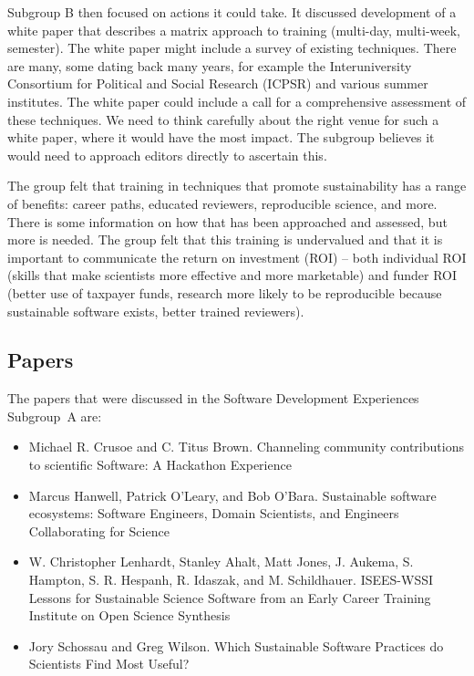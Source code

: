 \documentclass[11pt, oneside]{amsart}
\begin{document}
Subgroup B then focused on actions it could take. It discussed development of a
white paper that describes a matrix approach to training (multi-day, multi-week,
semester). The white paper might include a survey of existing techniques. There
are many, some dating back many years, for example the Interuniversity
Consortium for Political and Social Research (ICPSR) and various summer
institutes. The white paper could include a call for a comprehensive assessment
of these techniques. We need to think carefully about the right venue for such a
white paper, where it would have the most impact. The subgroup believes it would
need to approach editors directly to ascertain this.

The group felt that training in techniques that promote sustainability has a
range of benefits: career paths, educated reviewers, reproducible science, and
more. There is some information on how that has been approached and assessed,
but more is needed. The group felt that this training is undervalued and that it
is important to communicate the return on investment (ROI) -- both individual ROI
(skills that make scientists more effective and more marketable) and funder ROI
(better use of taxpayer funds, research more likely to be reproducible because
sustainable software exists, better trained reviewers).



\subsection{Papers}
The papers that were discussed in the Software Development Experiences Subgroup~A are:

\begin{itemize}
\item Michael R. Crusoe and C. Titus Brown. Channeling community contributions to
scientific Software: A Hackathon Experience~\cite{wssspe2_crusoe}

\item Marcus Hanwell, Patrick O'Leary, and Bob O'Bara. Sustainable software
ecosystems: Software Engineers, Domain Scientists, and Engineers Collaborating
for Science~\cite{wssspe2_hanwell}

\item W. Christopher Lenhardt, Stanley Ahalt, Matt Jones, J. Aukema, S. Hampton,
S. R. Hespanh, R. Idaszak, and M. Schildhauer. {ISEES-WSSI} Lessons for
Sustainable Science Software from an Early Career Training Institute on Open
Science Synthesis~\cite{wssspe2_lenhardt}

\item Jory Schossau and Greg Wilson. Which Sustainable Software Practices do
Scientists Find Most Useful?~\cite{wssspe2_schossau}

\end{itemize}
\end{document}
